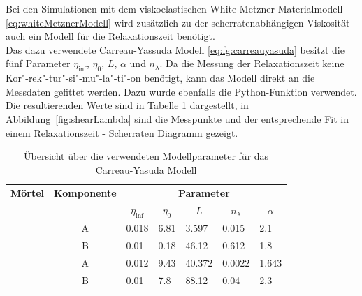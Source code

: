 Bei den Simulationen mit dem viskoelastischen White-Metzner Materialmodell \eqref{eq:whiteMetznerModell} wird zusätzlich zu der scherratenabhängigen Viskosität auch ein Modell für die Relaxationszeit benötigt.\\
Das dazu verwendete Carreau-Yassuda Modell \eqref{eq:fg:carreauyasuda} besitzt die fünf Parameter $\eta_{\inf}$, $\eta_0$, $L$, $\alpha$ und $n_{\lambda}$. Da die Messung der Relaxationszeit keine Kor"-rek"-tur"-si"-mu"-la"-ti"-on benötigt, kann das Modell direkt an die Messdaten gefittet werden.
Dazu wurde ebenfalls die Python-Funktion  verwendet. Die resultierenden Werte sind in Tabelle \ref{fig:relaxParameter} dargestellt, in Abbildung~\ref{fig:shearLambda} sind die Messpunkte und der entsprechende Fit in einem Relaxationszeit - Scherraten Diagramm gezeigt.
\begin{table}[tbh]
    \centering
    \begin{tabular}{l c l l l l l}
        \toprule[1.5pt]
        \textbf{Mörtel} & 
        \textbf{Komponente} & 
        \multicolumn{5}{c}{\textbf{Parameter}}\\
        & &
        \multicolumn{1}{c}{$\eta_{\inf}$} & 
        \multicolumn{1}{c}{$\eta_0$} &
        \multicolumn{1}{c}{$L$} & 
        \multicolumn{1}{c}{$n_{\lambda}$} & 
        \multicolumn{1}{c}{$\alpha$} \\
        \cmidrule(lr){3-7}
        \multirow{2}{*}{\moertelA{}} & A & 0.018   & 6.81  & 3.597 & 0.015 & 2.1       \\ 
                                & B & 0.01  & 0.18  & 46.12 & 0.612 & 1.8     \\ 
        \addlinespace
        \multirow{2}{*}{\moertelB{}}  & A & 0.012 & 9.43 & 40.372  & 0.0022 & 1.643    \\ 
                                & B & 0.01   & 7.8  & 88.12  & 0.04 & 2.3         \\
        \bottomrule[1.5pt]
    \end{tabular}
    \caption{Übersicht über die verwendeten Modellparameter für das Carreau-Yasuda Modell}
    \label{fig:relaxParameter}
\end{table}
%
